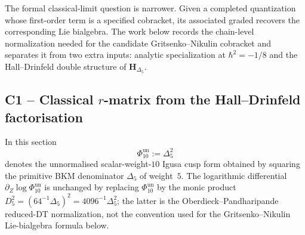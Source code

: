 The formal classical-limit question is narrower. Given a completed
quantization whose first-order term is a specified cobracket, its
associated graded recovers the corresponding Lie bialgebra. The work
below records the chain-level normalization needed for the candidate
Gritsenko--Nikulin cobracket and separates it from two extra inputs:
analytic specialization at $\hbar^2=-1/8$ and the Hall--Drinfeld
double structure of $\mathbf H_{\Delta_5}$.

\subsection{C1 -- Classical $r$-matrix from the Hall--Drinfeld factorisation}
\label{subsec:defq-C1-classical-r}

In this section
\[
 \Phi_{10}^{\mathrm{un}} := \Delta_5^2
\]
denotes the unnormalised scalar-weight-$10$ Igusa cusp form obtained
by squaring the primitive BKM denominator $\Delta_5$ of weight~$5$.
The logarithmic differential
$\partial_Z\log\Phi_{10}^{\mathrm{un}}$ is unchanged by replacing
$\Phi_{10}^{\mathrm{un}}$ by the monic product
$D_5^2=(64^{-1}\Delta_5)^2=4096^{-1}\Delta_5^2$; the latter is the
Oberdieck--Pandharipande reduced-DT normalization, not the convention
used for the Gritsenko--Nikulin Lie-bialgebra formula below.

